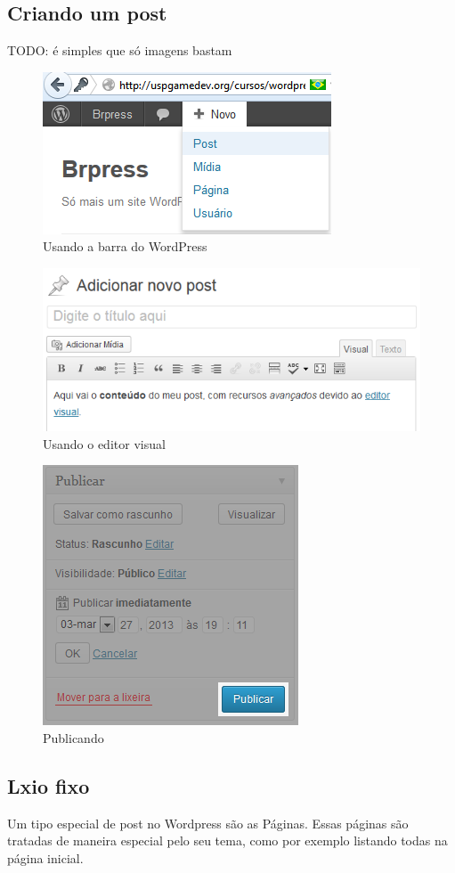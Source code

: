 \documentclass[12pt,onecolumn]{article}
\begin{document}
	\subsection{Criando um post}
		TODO: é simples que só imagens bastam
		\begin{figure}[H]
			\centering
			\includegraphics{post1.png}
			\caption{Usando a barra do WordPress}
		\end{figure}
		\begin{figure}[H]
			\centering
			\includegraphics{post2.png}
			\caption{Usando o editor visual}
		\end{figure}
		\begin{figure}[H]
			\centering
			\includegraphics{post3.png}
			\caption{Publicando}
		\end{figure}

	\subsection{Lxio fixo}
		Um tipo especial de post no Wordpress são as Páginas.
		Essas páginas são tratadas de maneira especial pelo seu tema, como por exemplo listando todas na página inicial.
		
\end{document}
